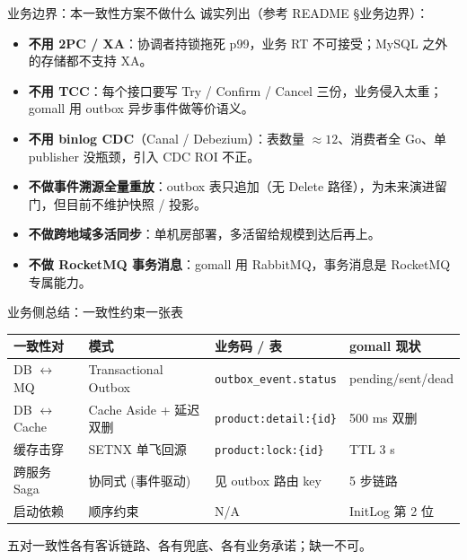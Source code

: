 \documentclass[aspectratio=169,11pt]{beamer}
\begin{document}
\begin{frame}[shrink]{业务边界：本一致性方案不做什么}
诚实列出（参考 README \S 业务边界）：
\begin{itemize}
  \item \textbf{不用 2PC / XA}：协调者持锁拖死 p99，业务 RT 不可接受；MySQL 之外的存储都不支持 XA。
  \item \textbf{不用 TCC}：每个接口要写 Try / Confirm / Cancel 三份，业务侵入太重；gomall 用 outbox 异步事件做等价语义。
  \item \textbf{不用 binlog CDC}（Canal / Debezium）：表数量 $\approx 12$、消费者全 Go、单 publisher 没瓶颈，引入 CDC ROI 不正。
  \item \textbf{不做事件溯源全量重放}：outbox 表只追加（无 Delete 路径），为未来演进留门，但目前不维护快照 / 投影。
  \item \textbf{不做跨地域多活同步}：单机房部署，多活留给规模到达后再上。
  \item \textbf{不做 RocketMQ 事务消息}：gomall 用 RabbitMQ，事务消息是 RocketMQ 专属能力。
\end{itemize}
\end{frame}

\begin{frame}[shrink]{业务侧总结：一致性约束一张表}
\begin{tabular}{@{}llll@{}}
\toprule
一致性对 & 模式 & 业务码 / 表 & gomall 现状 \\
\midrule
DB $\leftrightarrow$ MQ      & Transactional Outbox  & \texttt{outbox\_event.status} & pending/sent/dead \\
DB $\leftrightarrow$ Cache   & Cache Aside + 延迟双删 & \texttt{product:detail:\{id\}} & 500 ms 双删 \\
缓存击穿                     & SETNX 单飞回源        & \texttt{product:lock:\{id\}}   & TTL 3 s \\
跨服务 Saga                  & 协同式 (事件驱动)     & 见 outbox 路由 key            & 5 步链路 \\
启动依赖                     & 顺序约束             & N/A                            & InitLog 第 2 位 \\
\bottomrule
\end{tabular}
\vspace{2mm}
\small 五对一致性各有客诉链路、各有兜底、各有业务承诺；缺一不可。
\end{frame}

\appendix
\end{document}
